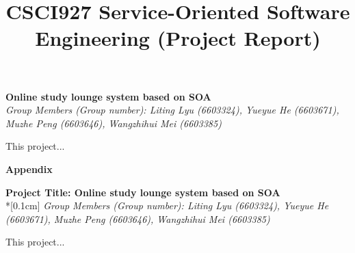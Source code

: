 \documentclass[runningheads]{llncs}
\begin{document}
\title{\large{CSCI927 Service-Oriented Software Engineering (Project Report)}}
\author{}
\institute{}
\maketitle
\vspace{-1cm}



\begin{center}
\Large{\textbf{Online study lounge system based on SOA}} \\ %
\vspace{0.2cm}
\large{\emph{Group Members (Group number): Liting Lyu (6603324), Yueyue  He (6603671), Muzhe Peng (6603646), Wangzhihui Mei (6603385)}} \\%
\vspace{0.3cm}
\end{center}

\noindent This project...


\clearpage
\begin{flushleft}
\huge{\textbf{Appendix}}
\end{flushleft}
\begin{center}
\Large{\textbf{Project Title:  Online study lounge system based on SOA }} \\*[0.1cm]%
\large{\emph{Group Members (Group number): Liting Lyu (6603324), Yueyue  He (6603671), Muzhe Peng (6603646), Wangzhihui Mei (6603385)}} %
\end{center}


\noindent This project...

    
\end{document}
